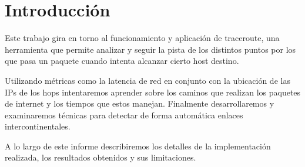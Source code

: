 \section{Introducción}

Este trabajo gira en torno al funcionamiento y aplicación de traceroute, una herramienta que permite analizar y seguir la pista de los distintos puntos por los que pasa un paquete cuando intenta alcanzar cierto host destino.

Utilizando métricas como la latencia de red en conjunto con la ubicación de las IPs de los hops intentaremos aprender sobre los caminos que realizan los paquetes de internet y los tiempos que estos manejan. Finalmente desarrollaremos y examinaremos técnicas para detectar de forma automática enlaces intercontinentales.

A lo largo de este informe describiremos los detalles de la implementación realizada, los resultados obtenidos y sus limitaciones.
